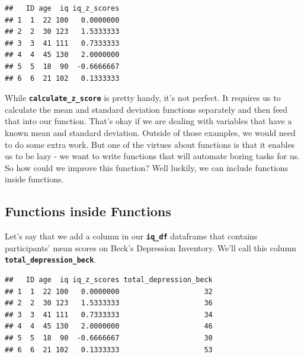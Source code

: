 \documentclass[
]{book}
\newenvironment{Shaded}{\begin{snugshade}}{\end{snugshade}}
\newcommand{\CommentTok}[1]{\textcolor[rgb]{0.56,0.35,0.01}{\textit{#1}}}
\newcommand{\DecValTok}[1]{\textcolor[rgb]{0.00,0.00,0.81}{#1}}
\newcommand{\FunctionTok}[1]{\textcolor[rgb]{0.13,0.29,0.53}{\textbf{#1}}}
\newcommand{\NormalTok}[1]{#1}
\newcommand{\OtherTok}[1]{\textcolor[rgb]{0.56,0.35,0.01}{#1}}
\newcommand{\SpecialCharTok}[1]{\textcolor[rgb]{0.81,0.36,0.00}{\textbf{#1}}}
\begin{document}
\begin{verbatim}
##   ID age  iq iq_z_scores
## 1  1  22 100   0.0000000
## 2  2  30 123   1.5333333
## 3  3  41 111   0.7333333
## 4  4  45 130   2.0000000
## 5  5  18  90  -0.6666667
## 6  6  21 102   0.1333333
\end{verbatim}

While \textbf{\texttt{calculate\_z\_score}} is pretty handy, it's not perfect. It requires us to calculate the mean and standard deviation functions separately and then feed that into our function. That's okay if we are dealing with variables that have a known mean and standard deviation. Outside of those examples, we would need to do some extra work. But one of the virtues about functions is that it enables us to be lazy - we want to write functions that will automate boring tasks for us. So how could we improve this function? Well luckily, we can include functions inside functions.

\hypertarget{functions-inside-functions}{%
\subsection{Functions inside Functions}\label{functions-inside-functions}}

Let's say that we add a column in our \textbf{\texttt{iq\_df}} dataframe that contains participants' mean scores on Beck's Depression Inventory. We'll call this column \textbf{\texttt{total\_depression\_beck}}.

\begin{Shaded}
\end{Shaded}

\begin{verbatim}
##   ID age  iq iq_z_scores total_depression_beck
## 1  1  22 100   0.0000000                    32
## 2  2  30 123   1.5333333                    36
## 3  3  41 111   0.7333333                    34
## 4  4  45 130   2.0000000                    46
## 5  5  18  90  -0.6666667                    30
## 6  6  21 102   0.1333333                    53
\end{verbatim}
\end{document}
